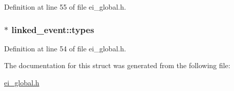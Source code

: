 Definition at line 55 of file ei\_\-global.h.\hypertarget{structlinked__event_a547d0483e1a92773dcd491feaefbce41}{
\subsubsection[{types}]{$\ast$ {\bf linked\_\-event::types}}}
\label{structlinked__event_a547d0483e1a92773dcd491feaefbce41}


Definition at line 54 of file ei\_\-global.h.

The documentation for this struct was generated from the following file:\begin{DoxyCompactItemize}
\item 
\hyperlink{ei__global_8h}{ei\_\-global.h}\end{DoxyCompactItemize}
